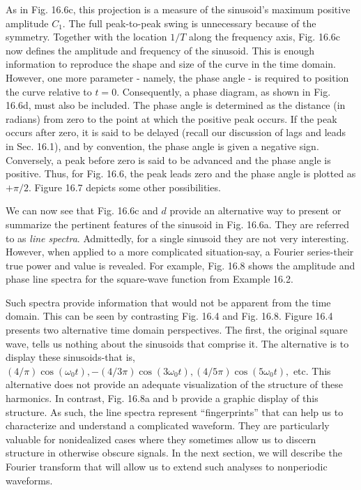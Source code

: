 \documentclass[../main.tex]{subfiles}
\begin{document}
As in Fig. 16.6c, this projection is a measure of the sinusoid's maximum positive
amplitude $C_1$. The full peak-to-peak swing is unnecessary because of the symmetry.
Together with the location $1/T$ along the frequency axis, Fig. 16.6c now defines the
amplitude and frequency of the sinusoid. This is enough information to reproduce the
shape and size of the curve in the time domain. However, one more parameter - namely,
the phase angle - is required to position the curve relative to $t = 0$. Consequently, a
phase diagram, as shown in Fig. 16.6d, must also be included. The phase angle is determined as the distance (in radians) from zero to the point at which the positive peak
occurs. If the peak occurs after zero, it is said to be delayed (recall our discussion of lags
and leads in Sec. 16.1), and by convention, the phase angle is given a negative sign.
Conversely, a peak before zero is said to be advanced and the phase angle is positive.
Thus, for Fig. 16.6, the peak leads zero and the phase angle is plotted as $+\pi / 2$. Figure 16.7 depicts some other possibilities.

We can now see that Fig. 16.6c and $d$ provide an alternative way to present or summarize the pertinent features of the sinusoid in Fig. 16.6a. They are referred to as \textit{line spectra}.
Admittedly, for a single sinusoid they are not very interesting. However, when applied to a
more complicated situation-say, a Fourier series-their true power and value is revealed.
For example, Fig. 16.8 shows the amplitude and phase line spectra for the square-wave
function from Example 16.2.

Such spectra provide information that would not be apparent from the time domain.
This can be seen by contrasting Fig. 16.4 and Fig. 16.8. Figure 16.4 presents two alternative time domain perspectives. The first, the original square wave, tells us nothing
about the sinusoids that comprise it. The alternative is to display these sinusoids-that
is, $(4 / \pi) \cos(\omega_0 t), -(4/3 \pi) \cos(3 \omega_0 t), (4/5 \pi) \cos(5 \omega_0t ),$ etc. This alternative does
not provide an adequate visualization of the structure of these harmonics. In contrast,
Fig. 16.8a and b provide a graphic display of this structure. As such, the line spectra
represent ``fingerprints'' that can help us to characterize and understand a complicated
waveform. They are particularly valuable for nonidealized cases where they sometimes
allow us to discern structure in otherwise obscure signals. In the next section, we will
describe the Fourier transform that will allow us to extend such analyses to nonperiodic
waveforms.
\end{document}
